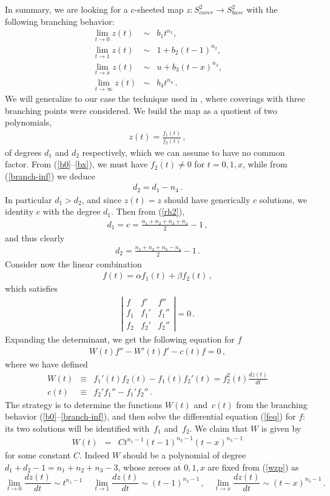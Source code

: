 \documentclass[letterpaper]{JHEP3}
\def\bea{\begin{eqnarray}}
\def\eea{\end{eqnarray}}
\def\be{\begin{equation}}
\def\ee{\end{equation}}
\def\be{\begin{eqnarray}}
\def\ee{\end{eqnarray}}
\begin{document}
In summary, we are  looking for a $c$-sheeted map $z: S^2_{cover} \to S^2_{base}$
with the following branching behavior:
\be \label{b0}
\lim_{t \rightarrow 0} z(t) &\sim &  b_1 t^{n_1},
\\ \label{b1}
\lim_{t \rightarrow 1} z(t) &\sim& 1 + b_2(t-1)^{n_2},
\\ \label{bx}
\lim_{t \rightarrow x} z(t) &\sim& u + b_3(t-x)^{n_3},
\\
\lim_{t \rightarrow \infty } z(t) &\sim& b_4 t^{n_4} \,.
\label{branch-inf}
\ee
We will generalize to our case the technique used in \cite{Lunin:2000yv}, where coverings with three branching points were considered.
We build the map as a quotient of two polynomials,
\be\label{mapf12}
z(t) = \frac{f_1(t)}{f_2(t)} \, ,
\ee
of degrees $d_1$ and $d_2$ respectively, which we can assume to have no common factor.
  From (\ref{b0}--\ref{bx}), we must have
$f_2(t)\neq 0$   for $t =0, 1, x$, 
while from (\ref{branch-inf}) we deduce
\be \label{d2=}
d_2 = d_1 -n_4 \,.
\ee
In particular $d_1>d_2$, and since $z(t)= z$ should have
generically $c$ solutions, we identity $c$ with the degree $d_1$.  Then
from  (\ref{rh2}),
\be
d_1 = c = \frac{n_1 +n_2 +n_3 +n_4}{2} -1 \, ,
\ee
and thus clearly
\be
d_2  = \frac{n_1 +n_2 +n_3 - n_4}{2} -1 \,.
\ee
Consider now the linear combination
\be
f(t) = \alpha f_1(t) + \beta f_2(t) \, ,
\label{lin-comb}
\ee
which satisfies
\be
\left|
\begin{array}{ccc}
f & f' & f'' \\
f_1 & f_1' & f_1'' \\
f_2 & f_2' & f_2''
\end{array}
\right| =0\,.
\ee
Expanding the determinant, we get the following equation for $f$
\be
W (t) f'' -W'(t) f' - c(t)f = 0 \, ,
\label{feq}
\ee
where we have defined
\bea
W(t)  & \equiv &  f_1'(t) f_2(t) - f_1(t) f_2'(t)
=f^2_2(t) \frac{dz(t)}{dt}
\label{wzp} \\
c(t) &  \equiv & f_2' f_1'' - f_1'f_2'' \,.
\eea
The strategy is to determine the functions  $W(t)$ and~$c(t)$ from the branching behavior (\ref{b0}--\ref{branch-inf}),
and then solve the differential equation (\ref{feq}) for $f$:  its two solutions will be
identified with~$f_1$ and~$f_2$. We claim that $W$ is given by
\be
W(t) &=& Ct^{n_1-1}(t-1)^{n_2-1}(t-x)^{n_3-1}
\label{wsing}
\ee
for some constant $C$. Indeed $W$ should be a polynomial of degree
$d_1 + d_2 -1 =  n_1 +n_2 +n_3 - 3$,
whose zeroes at $0,1,x$ are fixed from (\ref{wzp}) as
\begin{equation}
\lim _{t \rightarrow 0}\frac{dz(t)}{dt} \sim t^{n_1-1}\, \quad
\lim _{t \rightarrow 1}\frac{dz(t)}{dt} \sim (t-1)^{n_2-1}\, ,\quad
\lim _{t \rightarrow x}\frac{dz(t)}{dt} \sim  (t-x)^{n_3-1} \,.
\label{zerosz}
\end{equation}
\end{document}

